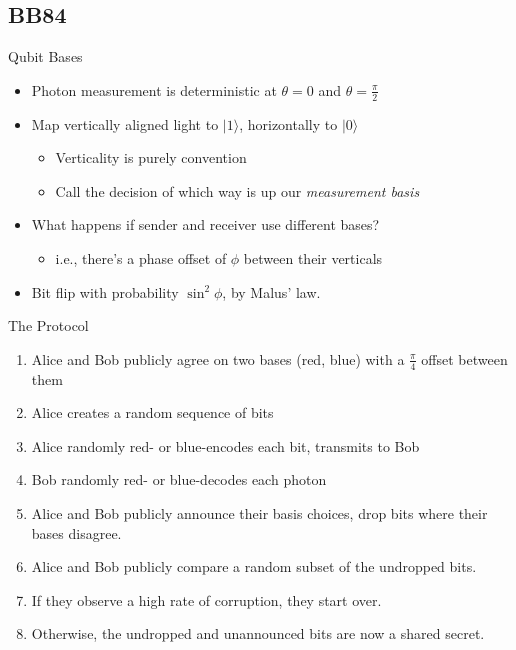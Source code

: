 \documentclass[pdf]{beamer}
\begin{document}
\subsection{BB84}
\begin{frame}{Qubit Bases}
  \begin{itemize}
  \item Photon measurement is deterministic at $\theta=0$ and $\theta=\frac{\pi}{2}$
  \item Map vertically aligned light to $|1\rangle$, horizontally to $|0\rangle$
    \begin{itemize}
    \item Verticality is purely convention
    \item Call the decision of which way is up our \emph{measurement basis}
    \end{itemize}
  \item What happens if sender and receiver use different bases?
    \begin{itemize}
    \item i.e., there's a phase offset of $\phi$ between their verticals
    \end{itemize}
  \item Bit flip with probability $\sin^2 \phi$, by Malus' law.
  \end{itemize}
\end{frame}

\begin{frame}{The Protocol}
  \begin{enumerate}
  \item Alice and Bob publicly agree on two bases (red, blue) with a
    $\frac{\pi}{4}$ offset between them
  \item Alice creates a random sequence of bits
  \item Alice randomly red- or blue-encodes each bit, transmits to Bob
  \item Bob randomly red- or blue-decodes each photon
  \item Alice and Bob publicly announce their basis choices, drop bits where
their bases disagree.
  \item Alice and Bob publicly compare a random subset of the undropped bits.
  \item If they observe a high rate of corruption, they start over.
  \item Otherwise, the undropped and unannounced bits are now a shared secret.
  \end{enumerate}
\end{frame}
\end{document}
